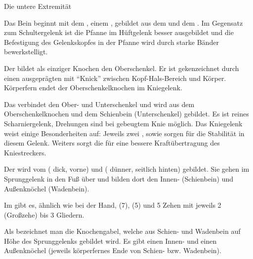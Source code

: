 \TextSlidePicture
{Die untere Extremität}%
{%
\label{topic:untere-extremitaet}%
%
Das Bein beginnt mit dem , einem
, gebildet aus dem  und dem
. Im Gegensatz zum Schultergelenk ist
die Pfanne im Hüftgelenk besser ausgebildet und die
Befestigung des Gelenkskopfes in der Pfanne wird durch
starke Bänder bewerkstelligt.

Der   bildet als einziger
Knochen den Oberschenkel. 
%
Er ist gekenzeichnet durch einen
ausgeprägten  mit \protect\enquote{Knick}
zwischen Kopf-Hals-Bereich und Körper. Körperfern endet der
Oberschenkelknochen im Kniegelenk.

Das  verbindet den Ober- und Unterschenkel und
wird aus dem Oberschenkelknochen und dem Schienbein
(Unterschenkel) gebildet. 
%
Es ist  reines Scharniergelenk, 
Drehungen sind bei gebeugtem Knie möglich.
Das Kniegelenk weist einige Besonderheiten auf:
%
Jeweils zwei 
, 
sowie 
sorgen für die Stabilität in diesem Gelenk. 
%
Weiters sorgt die   
für eine bessere Kraftübertragung des Kniestreckers.
\cite{PetersenVordereKreuzband1,MuellerKnie1,SchabusKnie1}

Der  wird vom  
( dick, vorne) 
und  ( dünner, seitlich hinten)
gebildet. 
%
Sie gehen im Sprunggelenk in den Fuß über und
bilden dort den Innen- (Schienbein) und Außenknöchel
(Wadenbein).

Im  gibt es, ähnlich wie bei der Hand,
 (7),  (5) und 5 Zehen mit
jeweils 2 (Großzehe) bis 3 Gliedern.

Als  bezeichnet man die Knochengabel, welche aus
Schien- und Wadenbein auf Höhe des Sprunggelenks gebildet
wird. Es gibt einen Innen- und einen Außenknöchel (jeweils
körperfernes Ende von Schien- bzw. Wadenbein). 
}%
